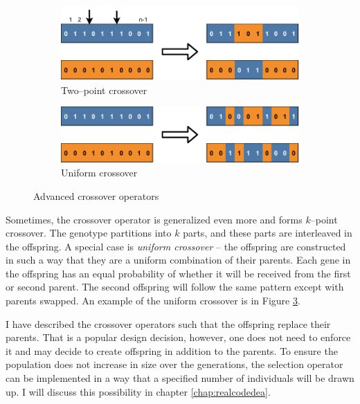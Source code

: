 \begin{figure}
    \begin{subfigure}[b]{0.4\textwidth}
        \includegraphics[width=\textwidth]{img/master_twopointcrossover.pdf}
        \caption{Two--point crossover}
        \label{fig:gatwopointcrossover}
    \end{subfigure}
    \hfill
    \begin{subfigure}[b]{0.4\textwidth}
        \includegraphics[width=\textwidth]{img/master_uniformcrossover.pdf}
        \caption{Uniform crossover}
        \label{fig:uniformcrossover}
    \end{subfigure}
    \caption{Advanced crossover operators}
\end{figure}

Sometimes, the crossover operator is generalized even more and forms $k$--point crossover. The genotype partitions into $k$ parts, and these parts are interleaved in the offspring. A special case is \emph{uniform crossover} -- the offspring are constructed in such a way that they are a uniform combination of their parents. Each gene in the offspring has an equal probability of whether it will be received from the first or second parent. The second offspring will follow the same pattern except with parents swapped. An example of the uniform crossover is in Figure \ref{fig:uniformcrossover}.

I have described the crossover operators such that the offspring replace their parents. That is a popular design decision, however, one does not need to enforce it and may decide to create offspring in addition to the parents. To ensure the population does not increase in size over the generations, the selection operator can be implemented in a way that a specified number of individuals will be drawn up. I will discuss this possibility in chapter \ref{chap:realcodedea}.

